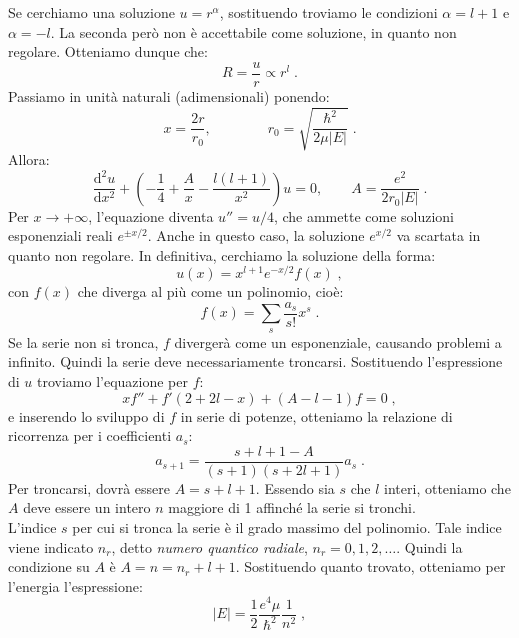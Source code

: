\documentclass[10pt,a4paper]{report}
\theoremstyle{definition}
\newcommand{\dev}[3][]{\frac{\mathrm{d}^{#1} #2}{\mathrm{d} #3^{#1}}}
\numberwithin{equation}{section}
\begin{document}
Se cerchiamo una soluzione $u=r^{\alpha}$, sostituendo troviamo le condizioni $\alpha=l+1$ e $\alpha=-l$. La seconda però non è accettabile come soluzione, in quanto non regolare. Otteniamo dunque che:
\begin{equation}
R=\frac{u}{r}\propto r^l\;.
\end{equation}
Passiamo in unità naturali (adimensionali) ponendo:
\begin{equation}
x=\frac{2r}{r_0}, \qquad \qquad r_0=\sqrt{\frac{\hbar^2}{2\mu|E|}}\;.
\end{equation}
Allora:
\begin{equation}
\dev[2]{u}{x}+\left(-\frac{1}{4}+\frac{A}{x}-\frac{l(l+1)}{x^2}\right)u=0, \qquad A=\frac{e^2}{2r_0|E|}\;.
\end{equation}
Per $x\to+\infty$, l'equazione diventa $u''=u/4$, che ammette come soluzioni esponenziali reali $e^{\pm x/2}$. Anche in questo caso, la soluzione $e^{x/2}$ va scartata in quanto non regolare. In definitiva, cerchiamo la soluzione della forma:
\begin{equation}
u(x)=x^{l+1}e^{-x/2}f(x)\;,
\end{equation}
con $f(x)$ che diverga al più come un polinomio, cioè:
\begin{equation}
f(x)=\sum_s \frac{a_s}{s!}x^s\;.
\end{equation}
Se la serie non si tronca, $f$ divergerà come un esponenziale, causando problemi a infinito. Quindi la serie deve necessariamente troncarsi. Sostituendo l'espressione di $u$ troviamo l'equazione per $f$:
\begin{equation}
xf''+f'(2+2l-x)+(A-l-1)f=0\;,
\end{equation}
e inserendo lo sviluppo di $f$ in serie di potenze, otteniamo la relazione di ricorrenza per i coefficienti $a_s$:
\begin{equation}
a_{s+1}=\frac{s+l+1-A}{(s+1)(s+2l+1)}a_s\;.
\end{equation}
Per troncarsi, dovrà essere $A=s+l+1$. Essendo sia $s$ che $l$ interi, otteniamo che $A$ deve essere un intero $n$ maggiore di 1 affinché la serie si tronchi. \\
L'indice $s$ per cui si tronca la serie è il grado massimo del polinomio. Tale indice viene indicato $n_r$, detto \textit{numero quantico radiale}, $n_r=0,1,2,\ldots$. Quindi la condizione su $A$ è $A=n=n_r+l+1$. Sostituendo quanto trovato, otteniamo per l'energia l'espressione:
\begin{equation}
|E|=\frac{1}{2}\frac{e^4\mu}{\hbar^2}\frac{1}{n^2}\;,
\end{equation}
\end{document}
